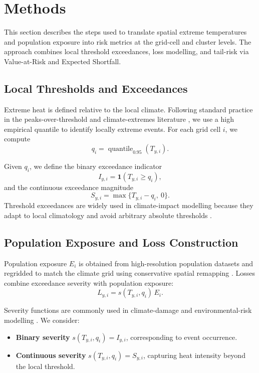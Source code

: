 \documentclass[12pt]{article}
\begin{document}
\section{Methods}

This section describes the steps used to translate spatial extreme temperatures and
population exposure into risk metrics at the grid-cell and cluster levels. The approach
combines local threshold exceedances, loss modelling, and tail-risk via
Value-at-Risk and Expected Shortfall. 

\subsection{Local Thresholds and Exceedances}

Extreme heat is defined relative to the local climate. Following standard practice in the
peaks-over-threshold and climate-extremes literature \citep{coles2001introduction,
huser2020spatial}, we use a high empirical quantile to identify locally extreme events.
For each grid cell $i$, we compute
\[
q_i = \operatorname{quantile}_{0.95}(T_{y,i}).
\]

Given $q_i$, we define the binary exceedance indicator
\[
I_{y,i} = \mathbf{1}(T_{y,i} \ge q_i),
\]
and the continuous exceedance magnitude
\[
S_{y,i} = \max \{ T_{y,i} - q_i,\ 0\}.
\]
Threshold exceedances are widely used in climate-impact modelling because they adapt to
local climatology and avoid arbitrary absolute thresholds
\citep{perkins2013measuring, zhang2011indices}.

\subsection{Population Exposure and Loss Construction}

Population exposure $E_i$ is obtained from high-resolution population datasets and
regridded to match the climate grid using conservative spatial remapping
\citep{schneider2017gpw, bondarenko2020ghsl}. Losses combine exceedance severity with
population exposure:
\[
L_{y,i} = s(T_{y,i}, q_i)\, E_i.
\]

Severity functions are commonly used in climate-damage and environmental-risk modelling
\citep{hallegatte2009future}. We consider:

\begin{itemize}
    \item \textbf{Binary severity}  
    $s(T_{y,i},q_i) = I_{y,i}$, corresponding to event occurrence.

    \item \textbf{Continuous severity}  
    $s(T_{y,i},q_i) = S_{y,i}$, capturing heat intensity beyond the local threshold.
\end{itemize}
\end{document}
